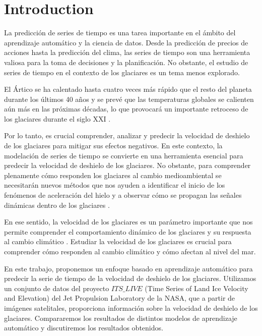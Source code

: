 \documentclass[sigconf,authordraft,language=spanish]{acmart}
\begin{document}

\maketitle

\section{Introduction}


La predicción de series de tiempo es una tarea importante en el
ámbito del aprendizaje automático y la ciencia de datos. Desde la
predicción de precios de acciones hasta la predicción del clima, las
series de tiempo son una herramienta valiosa para la toma de decisiones
y la planificación. No obstante, el estudio de series de tiempo en el contexto de los glaciares es un tema menos explorado.

El Ártico se ha calentado hasta cuatro veces más rápido que el resto del planeta durante los últimos 40 años 
y se prevé que las temperaturas globales se calienten aún más en las próximas décadas, 
lo que provocará un importante retroceso de los glaciares durante el siglo XXI \cite{kavan_new_2025}.

Por lo tanto, es crucial comprender, analizar y predecir la velocidad de deshielo de los glaciares para mitigar sus efectos negativos.
En este contexto, la modelación de series de tiempo se convierte en una herramienta esencial para predecir la velocidad de deshielo de los glaciares.
No obstante, para comprender plenamente cómo responden los glaciares al cambio medioambiental 
se necesitarán nuevos métodos que nos ayuden a identificar el inicio de los fenómenos de aceleración del hielo y a observar cómo se propagan las señales dinámicas dentro de los glaciares \cite{greene_detecting_2020}.

En ese sentido, la velocidad de los glaciares es un parámetro importante que nos permite comprender
el comportamiento dinámico de los glaciares y su respuesta al cambio climático \cite{zhang_validation_2024}.
Estudiar la velocidad de los glaciares es crucial para comprender cómo responden al cambio climático y cómo afectan al nivel del mar.

En este trabajo, proponemos un enfoque basado en aprendizaje automático para predecir la serie de tiempo de la velocidad de deshielo de los glaciares.
Utilizamos un conjunto de datos del proyecto  $ITS\_LIVE$ (Time Series of Land Ice Velocity and Elevation) del Jet Propulsion Laboratory de la NASA, que a partir de imágenes satelitales, proporciona información sobre la velocidad de deshielo de los glaciares.
Compararemos los resultados de distintos modelos de aprendizaje automático y discutiremos los resultados obtenidos.
\end{document}
